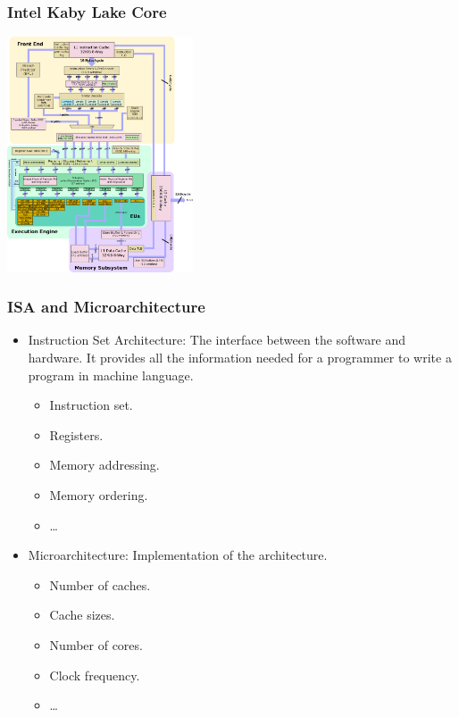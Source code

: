 \documentclass{beamer}
\begin{document}
\begin{frame}%
\frametitle{Intel Kaby Lake Core}

\vspace{-0.2cm}

\begin{center}
\includegraphics[width=5.5cm]{kabylake.png}
\end{center}

\end{frame}

\begin{frame}%
\frametitle{ISA and Microarchitecture}

\begin{itemize}

\item Instruction Set Architecture: The interface between the software and hardware. It provides
  all the information needed for a programmer to write a program in machine language.
  \begin{itemize}
  \item Instruction set.
  \item Registers.
  \item Memory addressing.
  \item Memory ordering.
  \item \ldots
  \end{itemize}

  \vspace{0.5cm}

\item Microarchitecture: Implementation of the architecture.
  \begin{itemize}
  \item Number of caches.
  \item Cache sizes.
  \item Number of cores.
  \item Clock frequency.
  \item \ldots
  \end{itemize}
\end{itemize}

\end{frame}
\end{document}
